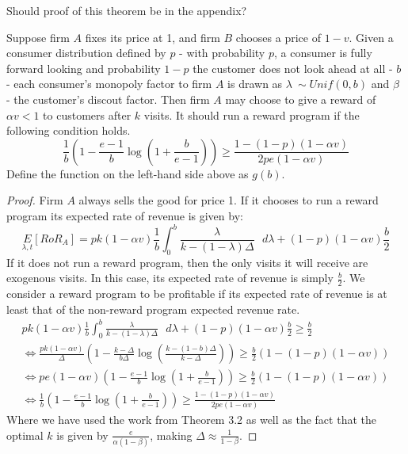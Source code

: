 {\nolan Should proof of this theorem be in the appendix?}

\begin{theorem}
Suppose firm $A$ fixes its price at 1, and firm $B$ chooses a price of $1-v$. Given a consumer distribution defined by $p$ - with probability $p$, a consumer is fully forward looking and probability $1-p$ the customer does not look ahead at all - $b$ - each consumer's monopoly factor to firm $A$ is drawn as $\lambda~\sim Unif(0,b)$ and $\beta$ - the customer's discout factor. Then firm $A$ may choose to give a reward of $\alpha v < 1$ to customers after $k$ visits. It should run a reward program if the following condition holds.
\begin{equation}
\frac{1}{b}\left(1-\frac{e-1}{b}\log \left(1+\frac{b}{e-1} \right) \right) \geq \frac{1-(1-p)(1-\alpha v)}{2pe(1-\alpha v)}
\end{equation}
Define the function on the left-hand side above as $g(b)$.
\end{theorem}

\begin{proof}
Firm $A$ always sells the good for price 1. If it chooses to run a reward program its expected rate of revenue is given by:
\begin{equation*}
\underset{\lambda, t}E[RoR_A] = pk(1-\alpha v)\frac{1}{b}\int_0^b \frac{\lambda}{k-(1-\lambda)\Delta} \mbox{ } d\lambda + (1-p)(1-\alpha v)\frac{b}{2}
\end{equation*}
If it does not run a reward program, then the only visits it will receive are exogenous visits. In this case, its expected rate of revenue is simply $\frac{b}{2}$. We consider a reward program to be profitable if its expected rate of revenue is at least that of the non-reward program expected revenue rate.
\begin{gather*}
pk(1-\alpha v)\frac{1}{b}\int_0^b \frac{\lambda}{k-(1-\lambda)\Delta} \mbox{ } d\lambda + (1-p)(1-\alpha v)\frac{b}{2} \geq \frac{b}{2} \\
\iff \frac{pk(1-\alpha v)}{\Delta}\left(1-\frac{k-\Delta}{b\Delta}\log \left(\frac{k-(1-b)\Delta}{k-\Delta} \right) \right) \geq \frac{b}{2}(1-(1-p)(1-\alpha v)) \\
\iff pe(1-\alpha v)\left(1-\frac{e-1}{b}\log \left(1+\frac{b}{e-1} \right) \right) \geq \frac{b}{2}(1-(1-p)(1-\alpha v)) \\
\iff \frac{1}{b}\left(1-\frac{e-1}{b}\log \left(1+\frac{b}{e-1} \right) \right) \geq \frac{1-(1-p)(1-\alpha v)}{2pe(1-\alpha v)}
\end{gather*}
Where we have used the work from Theorem 3.2 as well as the fact that the optimal $k$ is given by $\frac{e}{\alpha(1-\beta)}$, making $\Delta \approx \frac{1}{1-\beta}$. 
\end{proof}

